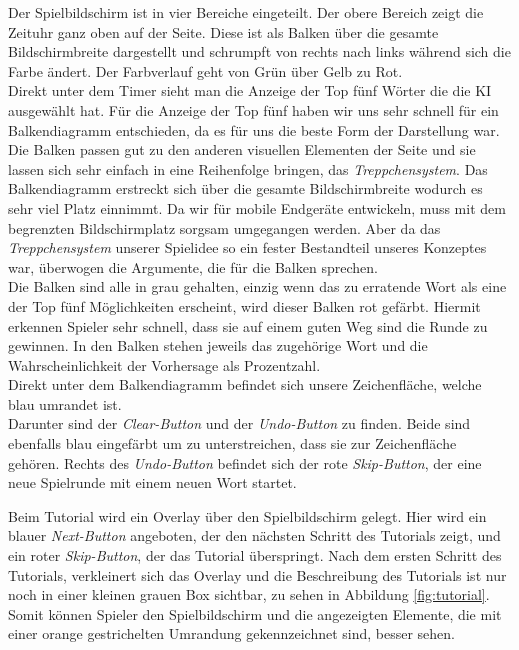 \documentclass[11pt]{article}
\begin{document}
Der Spielbildschirm ist in vier Bereiche eingeteilt. Der obere Bereich zeigt die  Zeituhr ganz oben auf der Seite. Diese ist als Balken über die gesamte Bildschirmbreite dargestellt und schrumpft von rechts nach links während sich die Farbe ändert. Der Farbverlauf geht von Grün über Gelb zu Rot. \\
Direkt unter dem Timer sieht man die Anzeige der Top fünf Wörter die die KI ausgewählt hat. Für die Anzeige der Top fünf haben wir uns sehr schnell für ein Balkendiagramm entschieden, da es für uns die beste Form der Darstellung war. Die Balken passen gut zu den anderen visuellen Elementen der Seite und sie lassen sich sehr einfach in eine Reihenfolge bringen, das \textit{Treppchensystem}. Das Balkendiagramm erstreckt sich über die gesamte Bildschirmbreite wodurch es sehr viel Platz einnimmt. Da wir für mobile Endgeräte entwickeln, muss mit dem begrenzten Bildschirmplatz sorgsam umgegangen werden. Aber da das \textit{Treppchensystem} unserer Spielidee so ein fester Bestandteil unseres Konzeptes war, überwogen die Argumente, die für die Balken sprechen. \\
Die Balken sind alle in grau gehalten, einzig wenn das zu erratende Wort als eine der Top fünf Möglichkeiten erscheint, wird dieser Balken rot gefärbt. Hiermit erkennen Spieler sehr schnell, dass sie auf einem guten Weg sind die Runde zu gewinnen. In den Balken stehen jeweils das zugehörige Wort und die Wahrscheinlichkeit der Vorhersage als Prozentzahl.\\ 
Direkt unter dem Balkendiagramm befindet sich unsere Zeichenfläche, welche blau umrandet ist.\\
Darunter sind der \textit{Clear-Button} und der \textit{Undo-Button} zu finden. Beide sind ebenfalls blau eingefärbt um zu unterstreichen, dass sie zur Zeichenfläche gehören. Rechts des \textit{Undo-Button} befindet sich der rote \textit{Skip-Button}, der eine neue Spielrunde mit einem neuen Wort startet.

Beim Tutorial wird ein Overlay über den Spielbildschirm gelegt. Hier wird ein blauer \textit{Next-Button} angeboten, der den nächsten Schritt des Tutorials zeigt, und ein roter \textit{Skip-Button}, der das Tutorial überspringt. Nach dem ersten Schritt des Tutorials, verkleinert sich das Overlay und die Beschreibung des Tutorials ist nur noch in einer kleinen grauen Box sichtbar, zu sehen in Abbildung \ref{fig:tutorial}. Somit können Spieler den Spielbildschirm und die angezeigten Elemente, die mit einer orange gestrichelten Umrandung gekennzeichnet sind, besser sehen.
\end{document}
